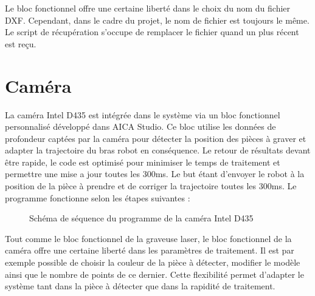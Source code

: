 Le bloc fonctionnel offre une certaine liberté dans le choix du nom du fichier DXF. Cependant, dans le cadre du projet, le nom de fichier est toujours le même. Le script de récupération s'occupe de remplacer le fichier quand un plus récent est reçu.

\section{Caméra}

La caméra Intel D435 est intégrée dans le système via un bloc fonctionnel personnalisé développé dans AICA Studio. Ce bloc utilise les données de profondeur captées par la caméra pour détecter la position des pièces à graver et adapter la trajectoire du bras robot en conséquence.
Le retour de résultats devant être rapide, le code est optimisé pour minimiser le temps de traitement et permettre une mise a jour toutes les 300ms. Le but étant d'envoyer le robot à la position de la pièce à prendre et de corriger la trajectoire toutes les 300ms.
Le programme fonctionne selon les étapes suivantes :
\begin{figure}[H]
    \centering
    \caption{Schéma de séquence du programme de la caméra Intel D435}
\end{figure}

Tout comme le bloc fonctionnel de la graveuse laser, le bloc fonctionnel de la caméra offre une certaine liberté dans les paramètres de traitement. Il est par exemple possible de choisir la couleur de la pièce à détecter, modifier le modèle ainsi que le nombre de points de ce dernier. Cette flexibilité permet d'adapter le système tant dans la pièce à détecter que dans la rapidité de traitement.

